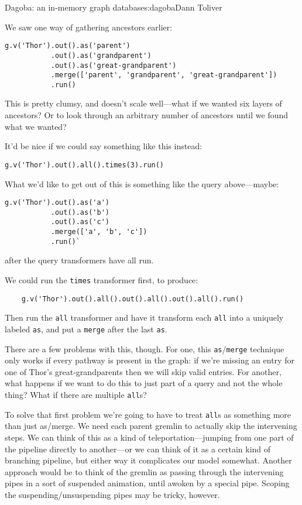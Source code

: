 \begin{aosachapter}{Dagoba: an in-memory graph database}{s:dagoba}{Dann Toliver}
\label{future-directions}

We saw one way of gathering ancestors earlier:

\begin{verbatim}
g.v('Thor').out().as('parent')
           .out().as('grandparent')
           .out().as('great-grandparent')
           .merge(['parent', 'grandparent', 'great-grandparent'])
           .run()
\end{verbatim}

This is pretty clumsy, and doesn't scale well---what if we wanted six
layers of ancestors? Or to look through an arbitrary number of ancestors
until we found what we wanted?

It'd be nice if we could say something like this instead:

\begin{verbatim}
g.v('Thor').out().all().times(3).run()
\end{verbatim}

What we'd like to get out of this is something like the query
above---maybe:

\begin{verbatim}
g.v('Thor').out().as('a')
           .out().as('b')
           .out().as('c')
           .merge(['a', 'b', 'c'])
           .run()`
\end{verbatim}

after the query transformers have all run.

We could run the \texttt{times} transformer first, to produce:

\begin{verbatim}
    g.v('Thor').out().all().out().all().out().all().run()
\end{verbatim}

Then run the \texttt{all} transformer and have it transform each
\texttt{all} into a uniquely labeled \texttt{as}, and put a
\texttt{merge} after the last \texttt{as}.

There are a few problems with this, though. For one, this
\texttt{as}/\texttt{merge} technique only works if every pathway is
present in the graph: if we're missing an entry for one of Thor's
great-grandparents then we will skip valid entries. For another, what
happens if we want to do this to just part of a query and not the whole
thing? What if there are multiple \texttt{all}s?

To solve that first problem we're going to have to treat \texttt{all}s
as something more than just as/merge. We need each parent gremlin to
actually skip the intervening steps. We can think of this as a kind of
teleportation---jumping from one part of the pipeline directly to
another---or we can think of it as a certain kind of branching pipeline,
but either way it complicates our model somewhat. Another approach would
be to think of the gremlin as passing through the intervening pipes in a
sort of suspended animation, until awoken by a special pipe. Scoping the
suspending/unsuspending pipes may be tricky, however.


\end{aosachapter}
